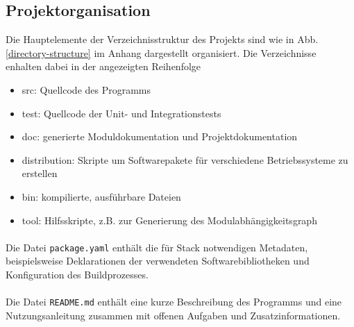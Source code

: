 \subsection{Projektorganisation}
Die Hauptelemente der Verzeichnisstruktur des Projekts sind wie in Abb. \ref{directory-structure}
im Anhang dargestellt organisiert. Die Verzeichnisse enhalten dabei in der angezeigten Reihenfolge

\begin{itemize}
    \item src: Quellcode des Programms
    \item test: Quellcode der Unit- und Integrationstests
    \item doc: generierte Moduldokumentation und Projektdokumentation
    \item distribution: Skripte um Softwarepakete für verschiedene Betriebssysteme zu erstellen
    \item bin: kompilierte, ausführbare Dateien
    \item tool: Hilfsskripte, z.B. zur Generierung des Modulabhängigkeitsgraph
\end{itemize}

\paragraph{}
Die Datei \texttt{package.yaml} enthält die für Stack notwendigen Metadaten,
beispielsweise Deklarationen der verwendeten Softwarebibliotheken und Konfiguration
des Buildprozesses.

\paragraph{}
Die Datei \texttt{README.md} enthält eine kurze Beschreibung des
Programms und eine Nutzungsanleitung zusammen mit offenen Aufgaben und
Zusatzinformationen.